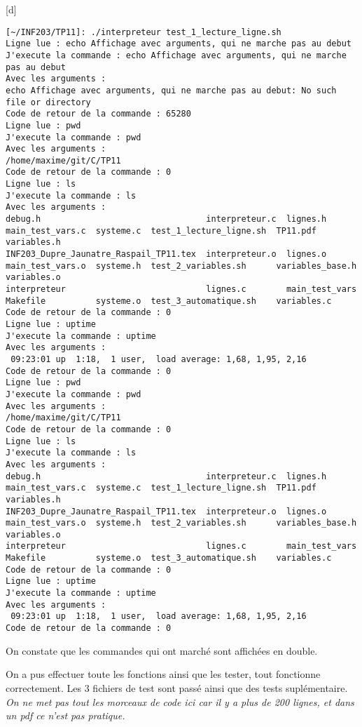 \documentclass[12pt,a4paper,notitlepage,colorinlistoftodos]{article}
\begin{document}
[d]
\begin{lstlisting}[language = rshell]
[~/INF203/TP11]: ./interpreteur test_1_lecture_ligne.sh
Ligne lue : echo Affichage avec arguments, qui ne marche pas au debut
J'execute la commande : echo Affichage avec arguments, qui ne marche pas au debut
Avec les arguments :
echo Affichage avec arguments, qui ne marche pas au debut: No such file or directory
Code de retour de la commande : 65280
Ligne lue : pwd
J'execute la commande : pwd
Avec les arguments :
/home/maxime/git/C/TP11
Code de retour de la commande : 0
Ligne lue : ls
J'execute la commande : ls
Avec les arguments :
debug.h                                 interpreteur.c  lignes.h        main_test_vars.c  systeme.c  test_1_lecture_ligne.sh  TP11.pdf          variables.h
INF203_Dupre_Jaunatre_Raspail_TP11.tex  interpreteur.o  lignes.o        main_test_vars.o  systeme.h  test_2_variables.sh      variables_base.h  variables.o
interpreteur                            lignes.c        main_test_vars  Makefile          systeme.o  test_3_automatique.sh    variables.c
Code de retour de la commande : 0
Ligne lue : uptime
J'execute la commande : uptime
Avec les arguments :
 09:23:01 up  1:18,  1 user,  load average: 1,68, 1,95, 2,16
Code de retour de la commande : 0
Ligne lue : pwd
J'execute la commande : pwd
Avec les arguments :
/home/maxime/git/C/TP11
Code de retour de la commande : 0
Ligne lue : ls
J'execute la commande : ls
Avec les arguments :
debug.h                                 interpreteur.c  lignes.h        main_test_vars.c  systeme.c  test_1_lecture_ligne.sh  TP11.pdf          variables.h
INF203_Dupre_Jaunatre_Raspail_TP11.tex  interpreteur.o  lignes.o        main_test_vars.o  systeme.h  test_2_variables.sh      variables_base.h  variables.o
interpreteur                            lignes.c        main_test_vars  Makefile          systeme.o  test_3_automatique.sh    variables.c
Code de retour de la commande : 0
Ligne lue : uptime
J'execute la commande : uptime
Avec les arguments :
 09:23:01 up  1:18,  1 user,  load average: 1,68, 1,95, 2,16
Code de retour de la commande : 0
\end{lstlisting}

On constate que les commandes qui ont marché sont affichées en double.


On a pus effectuer toute les fonctions ainsi que les tester, tout fonctionne correctement. Les 3 fichiers de test sont passé
ainsi que des tests suplémentaire. 
\textit{On ne met pas tout les morceaux de code ici car il y a plus de 200 lignes, et dans un pdf ce n'est pas pratique.}


\cite{}


\end{document}
